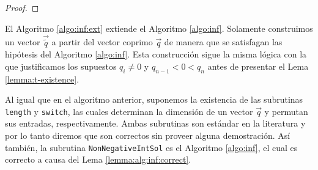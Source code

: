 \begin{proof}
\end{proof}

El Algoritmo \ref{algo:inf:ext} extiende el Algoritmo \ref{algo:inf}. Solamente construimos un
vector $\vec{\tilde{q}}$ a partir del vector coprimo $\vec{q}$ de manera que se satisfagan las
hipótesis del Algoritmo \ref{algo:inf}. Esta construcción sigue la misma lógica con la que
justificamos los supuestos $q_i \neq 0$ y $q_{n-1} < 0 < q_n$ antes de presentar el Lema
\ref{lemma:t-existence}.

Al igual que en el algoritmo anterior, suponemos la existencia de las subrutinas \texttt{length} y
\texttt{switch}, las cuales determinan la dimensión de un vector $\vec{q}$ y permutan sus entradas,
respectivamente. Ambas subrutinas son estándar en la literatura y por lo tanto diremos que son
correctos sin proveer alguna demostración. Así también, la subrutina \texttt{NonNegativeIntSol} es
el Algoritmo \ref{algo:inf}, el cual es correcto a causa del Lema \ref{lemma:alg:inf:correct}.

